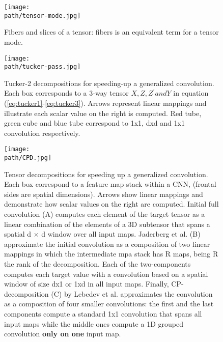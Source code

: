 \begin{figure}[h!]
 \centering
 \texttt{[image: \\path/tensor-mode.jpg]} 
 \caption{Fibers and slices of a tensor: fibers is an equivalent term for a tensor mode.}
 \label{fig:tensor-fibers}
\end{figure}

\begin{figure}[h!]
 \centering
 \texttt{[image: \\path/tucker-pass.jpg]} 
 \caption{Tucker-2  decompositions  for  speeding-up  a generalized convolution. Each box corresponds to a 3-way tensor $X, Z, Z^' and Y$ in equation (\ref{eq:tucker1}-\ref{eq:tucker3}). Arrows represent linear mappings 
and illustrate each scalar value on the right is computed. Red tube, green cube and blue tube correspond to 
1x1, dxd and 1x1 convolution respectively.}
 \label{fig:tucker-pass}
\end{figure}


\begin{figure}[h!]
 \centering
 \texttt{[image: \\path/CPD.jpg]} 
 \caption{Tensor decompositions for speeding up a generalized convolution. Each box correspond to a feature map stack within a CNN, (frontal sides are spatial dimensions). Arrows show linear mappings and demonstrate how scalar values on the right are computed. Initial full convolution (A) computes each element of the target tensor as a linear combination of the elements of a 3D subtensor that spans a spatial d × d window over all input maps. 
Jaderberg et al. (B) approximate the initial convolution as a composition of two linear mappings in which the intermediate mpa stack has R  maps, being R the rank of the decomposition. Each of the two-components 
computes each target value with a convolution based on a spatial window of size dx1 or 1xd in all input maps. Finally, CP-decomposition (C) by Lebedev et al. approximates the convolution as a composition of four smaller convolutions: the first and the last components compute a standard 1x1 convolution that spans all input maps while the middle ones compute a 1D grouped convolution \textbf{only on one} input map.}
 \label{fig:cpd-pass}
\end{figure}


